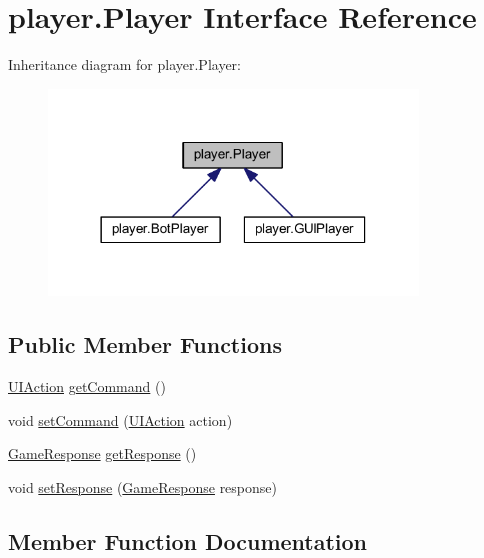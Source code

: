 \hypertarget{interfaceplayer_1_1_player}{}\section{player.\+Player Interface Reference}
\label{interfaceplayer_1_1_player}


Inheritance diagram for player.\+Player\+:
\nopagebreak
\begin{figure}[H]
\begin{center}
\leavevmode
\includegraphics[width=278pt]{interfaceplayer_1_1_player__inherit__graph}
\end{center}
\end{figure}
\subsection*{Public Member Functions}
\begin{DoxyCompactItemize}
\item 
\mbox{\hyperlink{classui_1_1_u_i_action}{U\+I\+Action}} \mbox{\hyperlink{interfaceplayer_1_1_player_a5ee58794f4ad8b342a3f1fcb87623c6d}{get\+Command}} ()
\item 
void \mbox{\hyperlink{interfaceplayer_1_1_player_a76a4425b3d1908982f07b75c4a054501}{set\+Command}} (\mbox{\hyperlink{classui_1_1_u_i_action}{U\+I\+Action}} action)
\item 
\mbox{\hyperlink{classui_1_1_game_response}{Game\+Response}} \mbox{\hyperlink{interfaceplayer_1_1_player_a1e537587aa2b804f6f27f7fd8af18a53}{get\+Response}} ()
\item 
void \mbox{\hyperlink{interfaceplayer_1_1_player_af07ff250619f6dabf201ee2e2f488a4f}{set\+Response}} (\mbox{\hyperlink{classui_1_1_game_response}{Game\+Response}} response)
\end{DoxyCompactItemize}


\subsection{Member Function Documentation}
\mbox{\label{interfaceplayer_1_1_player_a5ee58794f4ad8b342a3f1fcb87623c6d}} 
